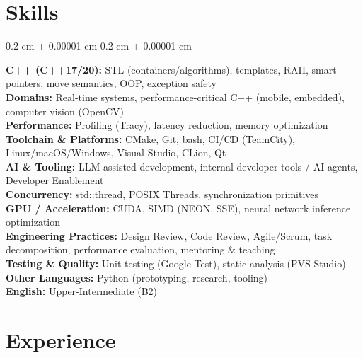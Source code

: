 \documentclass[10pt, letterpaper]{article}
\newenvironment{onecolentry}{
    \begin{adjustwidth}{
        0.2 cm + 0.00001 cm
    }{
        0.2 cm + 0.00001 cm
    }
}{
    \end{adjustwidth}
}
\begin{document}
    \section{Skills}
        \begin{onecolentry}
            \textbf{C++ (C++17/20):} STL (containers/algorithms), templates, RAII, smart pointers, move semantics, OOP, exception safety\\
            \textbf{Domains:} Real-time systems, performance-critical C++ (mobile, embedded), computer vision (OpenCV)\\
            \textbf{Performance:} Profiling (Tracy), latency reduction, memory optimization\\
            \textbf{Toolchain \& Platforms:} CMake, Git, bash, CI/CD (TeamCity), Linux/macOS/Windows, Visual Studio, CLion, Qt\\
            \textbf{AI \& Tooling:} LLM-assisted development, internal developer tools / AI agents, Developer Enablement\\
            \textbf{Concurrency:} std::thread, POSIX Threads, synchronization primitives\\
            \textbf{GPU / Acceleration:} CUDA, SIMD (NEON, SSE), neural network inference optimization\\
            \textbf{Engineering Practices:} Design Review, Code Review, Agile/Scrum, task decomposition, performance evaluation, mentoring \& teaching\\
            \textbf{Testing \& Quality:} Unit testing (Google Test), static analysis (PVS-Studio)\\
            \textbf{Other Languages:} Python (prototyping, research, tooling)\\
            \textbf{English:} Upper-Intermediate (B2)
        \end{onecolentry}

    \section{Experience}
\end{document}
